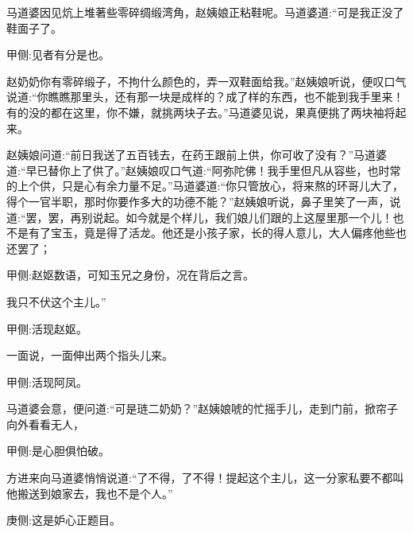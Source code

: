 \begin{parag}
    马道婆因见炕上堆著些零碎绸缎湾角，赵姨娘正粘鞋呢。马道婆道:“可是我正没了鞋面子了。\begin{note}甲侧:见者有分是也。\end{note}赵奶奶你有零碎缎子，不拘什么颜色的，弄一双鞋面给我。”赵姨娘听说，便叹口气说道:“你瞧瞧那里头，还有那一块是成样的？成了样的东西，也不能到我手里来！有的没的都在这里，你不嫌，就挑两块子去。”马道婆见说，果真便挑了两块袖将起来。
\end{parag}


\begin{parag}
    赵姨娘问道:“前日我送了五百钱去，在药王跟前上供，你可收了没有？”马道婆道:“早已替你上了供了。”赵姨娘叹口气道:“阿弥陀佛！我手里但凡从容些，也时常的上个供，只是心有余力量不足。”马道婆道:“你只管放心，将来熬的环哥儿大了，得个一官半职，那时你要作多大的功德不能？”赵姨娘听说，鼻子里笑了一声，说道:“罢，罢，再别说起。如今就是个样儿，我们娘儿们跟的上这屋里那一个儿！也不是有了宝玉，竟是得了活龙。他还是小孩子家，长的得人意儿，大人偏疼他些也还罢了；\begin{note}甲侧:赵妪数语，可知玉兄之身份，况在背后之言。\end{note}我只不伏这个主儿。”\begin{note}甲侧:活现赵妪。\end{note}一面说，一面伸出两个指头儿来。\begin{note}甲侧:活现阿凤。\end{note}马道婆会意，便问道:“可是琏二奶奶？”赵姨娘唬的忙摇手儿，走到门前，掀帘子向外看看无人，\begin{note}甲侧:是心胆俱怕破。\end{note}方进来向马道婆悄悄说道:“了不得，了不得！提起这个主儿，这一分家私要不都叫他搬送到娘家去，我也不是个人。”\begin{note}庚侧:这是妒心正题目。\end{note}
\end{parag}


